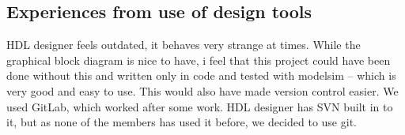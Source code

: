 \subsection{Experiences from use of design tools}
HDL designer feels outdated, it behaves very strange at times. While the graphical block diagram is nice to have, i feel that this project could have been done without this and written only in code and tested with modelsim -- which is very good and easy to use. This would also have made version control easier. We used GitLab, which worked after some work. HDL designer has SVN built in to it, but as none of the members has used it before, we decided to use git.  